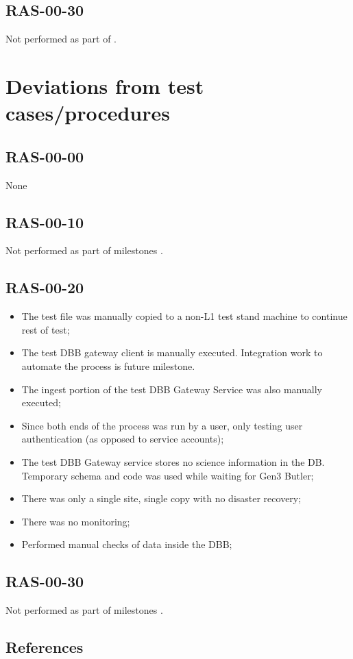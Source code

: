 \documentclass[DM,lsstdraft,STR,toc]{lsstdoc}
\begin{document}
\subsection{RAS-00-30}
\label{sect:detail-RAS-00-30}
Not performed as part of \milestoneId{}.



\section{Deviations from test cases/procedures}
\label{sect:deviations}

\subsection{RAS-00-00}
None
\subsection{RAS-00-10}
Not performed as part of milestones \milestoneId{}.
\subsection{RAS-00-20}
\begin{itemize}
   \item{
 The test file was manually copied to a non-L1 test stand machine
to continue rest of test;
}
   \item{
 The test DBB gateway client is manually executed.  Integration
work to automate the process is future milestone.
}
   \item{
 The ingest portion of the test DBB Gateway Service was also manually executed;
}
   \item{
 Since both ends of the process was run by a user, only testing user
authentication (as opposed to service accounts);
}
   \item{
 The test DBB Gateway service stores no science information in the
DB.  Temporary schema and code was used while waiting for Gen3 Butler;
}
   \item{
 There was only a single site, single copy with no disaster recovery;
}
   \item{
 There was no monitoring;
}
   \item{
 Performed manual checks of data inside the DBB;
}
\end{itemize}
\subsection {RAS-00-30}
Not performed as part of milestones \milestoneId{}.

\subsection{References}
\label{sect:references}

\renewcommand{\refname}{}

\end{document}
